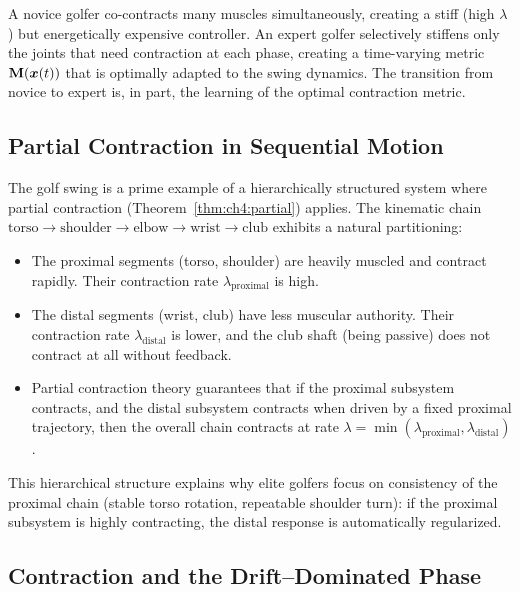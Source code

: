 \begin{intuitionbox}
A novice golfer co-contracts many muscles simultaneously, creating a stiff (high $\lambda$)
but energetically expensive controller. An expert golfer selectively stiffens only the
joints that need contraction at each phase, creating a time-varying metric
$\mathbf{M}(\bm{x}(t))$ that is optimally adapted to the swing dynamics. The transition from
novice to expert is, in part, the learning of the optimal contraction metric.
\end{intuitionbox}

\subsection{Partial Contraction in Sequential Motion}

The golf swing is a prime example of a hierarchically structured system where partial
contraction (Theorem~\ref{thm:ch4:partial}) applies. The kinematic chain
$\text{torso} \to \text{shoulder} \to \text{elbow} \to \text{wrist} \to \text{club}$
exhibits a natural partitioning:

\begin{itemize}
\item The proximal segments (torso, shoulder) are heavily muscled and contract rapidly.
      Their contraction rate $\lambda_{\text{proximal}}$ is high.
\item The distal segments (wrist, club) have less muscular authority. Their contraction
      rate $\lambda_{\text{distal}}$ is lower, and the club shaft (being passive) does
      not contract at all without feedback.
\item Partial contraction theory guarantees that if the proximal subsystem contracts,
      and the distal subsystem contracts when driven by a fixed proximal trajectory,
      then the overall chain contracts at rate
      $\lambda = \min(\lambda_{\text{proximal}}, \lambda_{\text{distal}})$.
\end{itemize}

This hierarchical structure explains why elite golfers focus on consistency of the
proximal chain (stable torso rotation, repeatable shoulder turn): if the proximal
subsystem is highly contracting, the distal response is automatically regularized.

\subsection{Contraction and the Drift--Dominated Phase}

